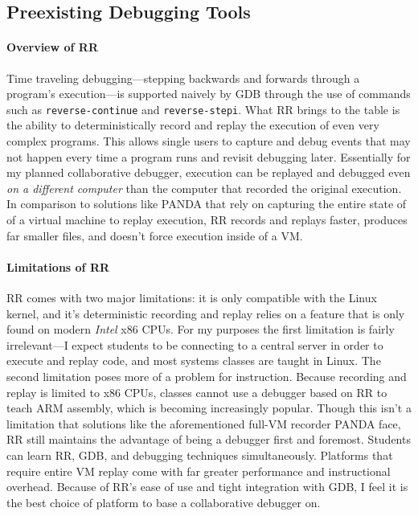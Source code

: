 \documentclass[12pt]{article}
\begin{document}

\subsection{Preexisting Debugging Tools}

\paragraph{Overview of RR}

Time traveling debugging---stepping backwards and forwards through a
program's execution---is supported naively by GDB through the use of
commands such as \lstinline{reverse-continue} and
\lstinline{reverse-stepi}.\cite{gdbman} What RR brings to the table is
the ability to deterministically record and replay the execution of
even very complex programs.  This allows single users to capture and
debug events that may not happen every time a program runs and revisit
debugging later.  Essentially for my planned collaborative debugger,
execution can be replayed and debugged even \textit{on a different
  computer} than the computer that recorded the original execution.
In comparison to solutions like PANDA\cite{10.1145/2843859.2843867}
that rely on capturing the entire state of of a virtual machine to
replay execution, RR records and replays faster, produces far smaller
files, and doesn't force execution inside of a
VM.\cite{DBLP:journals/corr/OCallahanJFHNP17}

\paragraph{Limitations of RR}

RR comes with two major limitations: it is only compatible with the
Linux kernel, and it's deterministic recording and replay relies on a
feature that is only found on modern \textit{Intel} x86 CPUs.  For my
purposes the first limitation is fairly irrelevant---I expect students
to be connecting to a central server in order to execute and replay
code, and most systems classes are taught in Linux.  The second
limitation poses more of a problem for instruction.  Because recording
and replay is limited to x86 CPUs, classes cannot use a debugger based
on RR to teach ARM assembly, which is becoming increasingly popular.
Though this isn't a limitation that solutions like the aforementioned
full-VM recorder PANDA face, RR still maintains the advantage of being
a debugger first and foremost.  Students can learn RR, GDB, and
debugging techniques simultaneously.  Platforms that require entire VM
replay come with far greater performance and instructional overhead.
Because of RR's ease of use and tight integration with GDB, I feel it
is the best choice of platform to base a collaborative debugger on.
\end{document}
